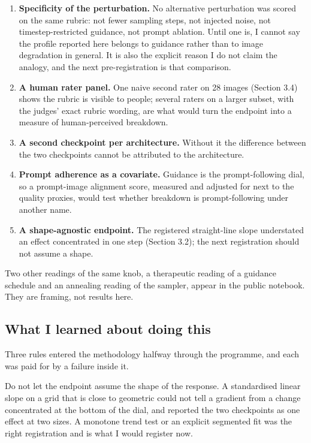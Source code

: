 \documentclass[11pt]{article}
\providecommand{\tightlist}{\setlength{\itemsep}{0pt}\setlength{\parskip}{0pt}}
\begin{document}
\begin{enumerate}
\def\labelenumi{\arabic{enumi}.}
\tightlist
\item
  \textbf{Specificity of the perturbation.} No alternative perturbation was
  scored on the same rubric: not fewer sampling steps, not injected noise, not
  timestep-restricted guidance, not prompt ablation. Until one is, I cannot say
  the profile reported here belongs to guidance rather than to image degradation
  in general. It is also the explicit reason I do not claim the analogy, and the
  next pre-registration is that comparison.
\item
  \textbf{A human rater panel.} One naive second rater on 28 images (Section
  3.4) shows the rubric is visible to people; several raters on a larger subset,
  with the judges' exact rubric wording, are what would turn the endpoint into a
  measure of human-perceived breakdown.
\item
  \textbf{A second checkpoint per architecture.} Without it the difference
  between the two checkpoints cannot be attributed to the architecture.
\item
  \textbf{Prompt adherence as a covariate.} Guidance is the prompt-following
  dial, so a prompt-image alignment score, measured and adjusted for next to the
  quality proxies, would test whether breakdown is prompt-following under
  another name.
\item
  \textbf{A shape-agnostic endpoint.} The registered straight-line slope
  understated an effect concentrated in one step (Section 3.2); the next
  registration should not assume a shape.
\end{enumerate}

Two other readings of the same knob, a therapeutic reading of a guidance
schedule and an annealing reading of the sampler, appear in the public notebook.
They are framing, not results here.

\subsection{What I learned about doing
this}\label{what-i-learned-about-doing-this}

Three rules entered the methodology halfway through the programme, and each was
paid for by a failure inside it.

Do not let the endpoint assume the shape of the response. A standardised linear
slope on a grid that is close to geometric could not tell a gradient from a
change concentrated at the bottom of the dial, and reported the two checkpoints
as one effect at two sizes. A monotone trend test or an explicit segmented fit
was the right registration and is what I would register now.
\end{document}
